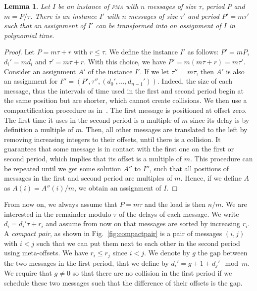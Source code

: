 \documentclass[10pt, conference, letterpaper]{IEEEtran}
\newtheorem{lemma}[theorem]{Lemma}
\newcommand\pma{\textsc{pma}\xspace}
\begin{document}
\begin{lemma}
Let $I$ be an instance of \pma with $n$ messages of size $\tau$, period $P$ and $m = P / \tau$. There is an instance $I'$ with $n$ messages of size $\tau'$ and period $P'= m\tau'$ such that an assignment of $I'$ can be transformed into an assignment of $I$ in polynomial time.
\end{lemma}
\begin{proof}
Let $P = m \tau + r$ with $r \leq \tau$. We define the instance $I'$ as follows: $P' = mP$, $d_{i}' = m d_i$ and $\tau' = m \tau + r$. With this choice, we have $P' = m(m \tau + r) = m \tau'$.
Consider an assignment $A'$ of the instance $I'$.
If we let $\tau'' = m\tau$, then $A'$ is also an assignment for $I'' = (P',\tau'',(d_{0}',\dots,d_{n-1}'))$. Indeed, the size of each message, thus the intervals of time used in the first and second period begin at the same position but are shorter, which cannot create collisions.
We then use a compactification procedure as in~\cite{barth2018deterministic}. The first message is positioned at offset zero. The first time it uses in the second period is a multiple of $m$ since its delay is by definition a multiple of $m$. Then, all other messages are translated to the left by removing increasing integers to their offsets, until there is a collision. It guarantees that some message is in contact with the first one on the first or second period,  which implies that its offset is a multiple of $m$. This procedure can be repeated until we get some solution $A''$ to $I''$, such that all positions of messages in the first and second period are multiples of $m$. Hence, if we define $A$ as $A(i) = A''(i)/m$, we obtain an assignment of $I$.
\end{proof}

From now on, we always assume that $P = m\tau$ and the load is then $n/m$.
We are interested in the remainder modulo $\tau$ of the delays of each message.
We write $d_i = d_{i}'\tau + r_i$ and assume from now on that messages are sorted by increasing $r_i$.
A \emph{compact pair}, as shown in Fig.~\ref{fig:compactpair} is a pair of messages $(i,j)$ with $i < j$ such that we can put them next to each other in the second period using meta-offsets.
We have $r_i \leq r_j$ since $i < j$. We denote by $g$ the gap between the two messages in the first period, that we define by $d_{i}' = g + 1 + d_{j}' \mod m$. We require that $g \neq 0$ so that there are no collision in the first period if we schedule these two messages such that the difference of their offsets is the gap. 
\end{document}
